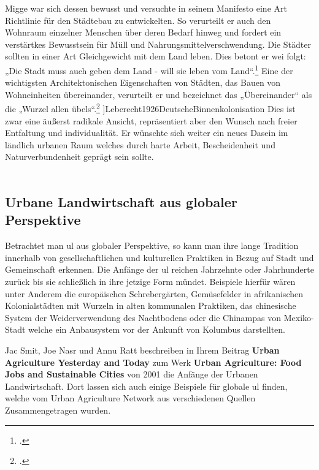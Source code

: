 \documentclass{scrartcl}
\begin{document}
Migge war sich dessen bewusst und versuchte in seinem Manifesto eine Art Richtlinie für den Städtebau zu entwickelten. So verurteilt er auch den Wohnraum einzelner Menschen über deren Bedarf hinweg und fordert ein verstärtkes Bewusstsein für Müll und Nahrungsmittelverschwendung. Die Städter sollten in einer Art Gleichgewicht mit dem Land leben. Dies betont er wei folgt: „Die Stadt muss auch geben dem Land - will sie leben vom Land“.\footcite[S. 10]{Leberecht1926DeutscheBinnenkolonisation} Eine der wichtigsten Architektonischen Eigenschaften von Städten, das Bauen von Wohneinheiten übereinander, verurteilt er und bezeichnet das „Übereinander“ als die „Wurzel allen übels“.\footcite[S. 13]{Leberecht1926DeutscheBinnenkolonisation} ]{Leberecht1926DeutscheBinnenkolonisation} Dies ist zwar eine äußerst radikale Ansicht, repräsentiert aber den Wunsch nach freier Entfaltung und individualität. Er wünschte sich weiter ein neues Dasein im ländlich urbanen Raum welches durch harte Arbeit, Bescheidenheit und Naturverbundenheit geprägt sein sollte.\\
\\
\subsection{Urbane Landwirtschaft aus globaler Perspektive}

Betrachtet man \acs{ul} aus globaler Perspektive, so kann man ihre lange Tradition innerhalb von gesellschaftlichen und kulturellen Praktiken in Bezug auf Stadt und Gemeinschaft erkennen. Die Anfänge der \acs{ul} reichen Jahrzehnte oder Jahrhunderte zurück bis sie schließlich in ihre jetzige Form mündet. Beispiele hierfür wären unter Anderem die europäischen Schrebergärten, Gemüsefelder in afrikanischen Kolonialstädten mit Wurzeln in alten kommunalen Praktiken, das chinesische System der Weiderverwendung des Nachtbodens oder die Chinampas von Mexiko-Stadt welche ein Anbausystem vor der Ankunft von Kolumbus darstellten.

Jac Smit, Joe Nasr und Annu Ratt beschreiben in Ihrem Beitrag \textbf{Urban Agriculture Yesterday and Today} zum Werk \textbf{Urban Agriculture: Food Jobs and Sustainable Cities} von 2001 die Anfänge der Urbanen Landwirtschaft. Dort lassen sich auch einige Beispiele für globale \acs{ul} finden, welche vom Urban Agriculture Network aus verschiedenen Quellen Zusammengetragen wurden.
\end{document}
